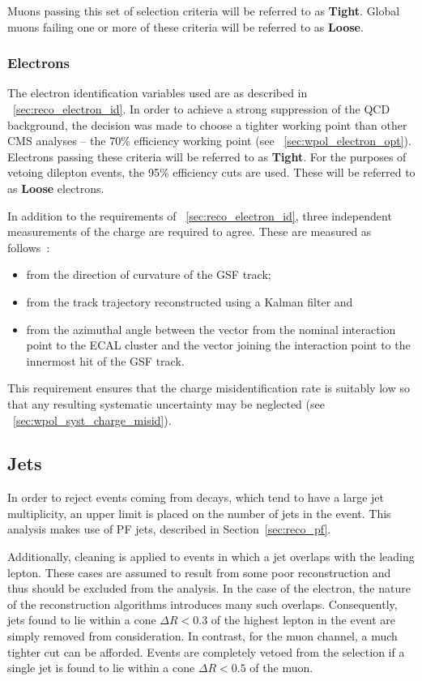 Muons passing this set of selection criteria will be referred to as
\textbf{Tight}. Global muons failing one or more of these criteria will be
referred to as \textbf{Loose}.

\subsubsection{Electrons}
\label{sec:wpol_electronid}
The electron identification variables used are as described in
\sec~\ref{sec:reco_electron_id}. In order to achieve a strong suppression of the
\ac{QCD} background, the decision was made to choose a tighter working point
than other \ac{CMS} analyses -- the 70\% efficiency working point (see
\sec~\ref{sec:wpol_electron_opt}). Electrons passing these criteria will be
referred to as \textbf{Tight}. For the purposes of vetoing dilepton events, the
95\% efficiency cuts are used. These will be referred to as \textbf{Loose}
electrons.

In addition to the requirements of \sec~\ref{sec:reco_electron_id}, three independent
measurements of the charge are required to agree. These are measured as follows~\cite{wcharge_asymm2}:
\begin{itemize}
\item from the direction of curvature of the \ac{GSF} track;
\item from the track trajectory reconstructed using a Kalman filter and
\item from the azimuthal angle between the vector from the nominal interaction
  point to the \ac{ECAL} cluster and the vector joining the interaction point to
  the innermost hit of the \ac{GSF} track.
\end{itemize}
This requirement ensures that the charge misidentification rate is suitably low
so that any resulting systematic uncertainty may be neglected (see
\sec~\ref{sec:wpol_syst_charge_misid}).

\subsection{Jets}
\label{sec:wpol_jets}
In order to reject events coming from \ttbar decays, which tend to have a large
jet multiplicity, an upper limit is placed on the number of jets in the
event. This analysis makes use of \ac{PF} jets, described in
Section~\ref{sec:reco_pf}.

Additionally, cleaning is applied to events in which a jet overlaps with the
leading lepton. These cases are assumed to result from some poor reconstruction
and thus should be excluded from the analysis. In the case of the electron, the
nature of the reconstruction algorithms introduces many such
overlaps. Consequently, jets found to lie within a cone $\Delta R < 0.3$ of the
highest \Pt lepton in the event are simply removed from consideration. In
contrast, for the muon channel, a much tighter cut can be afforded. Events are
completely vetoed from the selection if a single jet is found to lie within a
cone $\Delta R < 0.5$ of the muon.

